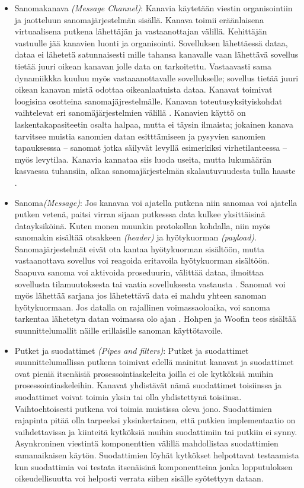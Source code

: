 \begin{itemize}
   \item Sanomakanava \textit{(Message Channel)}:
      Kanavia käytetään viestin organisointiin ja jaotteluun sanomajärjestelmän sisällä. Kanava toimii eräänlaisena virtuaalisena putkena lähettäjän ja vastaanottajan välillä. Kehittäjän vastuulle jää kanavien luonti ja organisointi. Sovelluksen lähettäessä dataa, dataa ei lähetetä satunnaisesti mille tahansa kanavalle vaan lähettävä sovellus tietää juuri oikean kanavan jolle data on tarkoitettu. Vastaavasti sama dynamiikkka kuuluu myös vastaaanottavalle sovellukselle; sovellus tietää juuri oikean kanavan mistä odottaa oikeanlaatuista dataa.
      Kanavat toimivat loogisina osotteina sanomajäjrestelmälle. Kanavan toteutusyksityiskohdat vaihtelevat eri sanomäjärjestelmien välillä \citep{EnterpriseIntegration} \citep{Hohpe2004}.
      Kanavien käyttö on laskentakapasiteetin osalta halpaa, mutta ei täysin ilmaista; jokainen kanava tarvitsee muistia sanomien datan esitttämiseen ja pysyvien sanomien tapauksesssa -- sanomat jotka säilyvät levyllä esimerkiksi virhetilanteessa -- myös levytilaa. Kanavia kannataa siis luoda useita, mutta lukumäärän kasvaessa tuhansiin, alkaa sanomajärjestelmän skalautuvuudesta tulla haaste \citep{Hohpe2004}.
   \item Sanoma\textit{(Message)}:
      Jos kanavaa voi ajatella putkena niin sanomaa voi ajatella putken vetenä, paitsi virran sijaan putkesssa data kulkee yksittäisinä datayksiköinä. Kuten monen muunkin protokollan kohdalla, niin myös sanomakin sisältää otsakkeen \textit{(header)} ja  hyötykuorman \textit{(payload)}. Sanomajärjestelmät eivät ota kantaa hyötykuorman sisältöön, mutta vastaanottava sovellus voi reagoida eritavoila hyötykuorman sisältöön. Saapuva sanoma voi aktivoida proseduurin, välittää dataa, ilmoittaa sovellusta tilamuutoksesta tai vaatia sovelluksesta vastausta \citep{Hohpe2004}. Sanomat voi myös lähettää sarjana jos lähetettävä data ei mahdu yhteen sanoman hyötykuormaan. Jos datalla on rajallinen voimassaoloaika, voi sanoma tarkentaa lähetetyn datan voimassa olo ajan \citep{Hohpe2004}. Hohpen ja Woofin teos sisältää suunnittelumallit näille erillaisille sanoman käyttötavoile.

   \newpage
   \item Putket ja suodattimet \textit{(Pipes and filters)}:
      Putket ja suodattimet suunnittelumallissa putkena toimivat edellä mainitut kanavat ja suodattimet ovat pieniä itsenäisiä prosessointiaskeleita joilla ei ole kytköksiä muihin prosessointiaskeleihin. Kanavat yhdistävät nämä suodattimet toisiinssa ja suodattimet voivat toimia yksin tai olla yhdistettynä toisiinsa. Vaihtoehtoisesti putkena voi toimia muistissa oleva jono. Suodattimien rajapinta pitää olla tarpeeksi yksinkertainen, että putkien implementaatio on vaihdettavissa ja kiinteitä kytköksiä muihin suodattimiin tai putkiin ei synny.
      Asynkroninen viestintä komponenttien välillä mahdollistaa suodattimien samanaikaisen käytön.
   Suodattimien löyhät kytkökset helpottavat testaamista kun suodattimia voi testata itsenäisinä komponentteina jonka lopputuloksen oikeudellisuutta voi helposti verrata siihen sisälle syötettyyn dataan.



\end{itemize}
